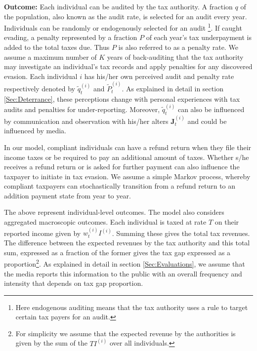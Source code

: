 \documentclass{NSF_proposal_mod}
\begin{document}

{\bf Outcome:} Each individual can be audited by the tax authority. A fraction $q$ of the population, also known as the audit rate,  is selected for an audit every year. Individuals can be randomly or endogenously selected for an audit \footnote{Here endogenous auditing means that the tax authority uses a rule to target certain tax payers for an audit.}.  If caught evading, a penalty represented by a fraction $P$ of each year's tax underpayment is added to the total taxes due. Thus $P$ is also referred to as a penalty rate. We assume a maximum number of $K$ years of back-auditing that the tax authority may investigate an individual's tax records and apply penalties for any discovered evasion. Each individual $i$ has his/her own perceived audit and penalty rate respectively denoted by $\tilde{q}^{(i)}_t$ and $\tilde{P}^{(i)}_t$. As explained in detail in section \ref{Sec:Deterrance}, these perceptions change with personal experiences with tax audits and penalties for under-reporting. Moreover, $\tilde{q}^{(i)}_t$ can also be influenced by communication and observation with his/her alters  $\mathbf{J}^{(i)}_t$ and could be influenced by media.   

In our model, compliant individuals can have a refund return when they file their income taxes or be required to pay an additional amount of taxes. Whether s/he receives a refund return or is asked for further payment can also influence the taxpayer to initiate in tax evasion. We assume a simple Markov process, whereby compliant taxpayers can stochastically transition from a refund return to an addition payment state from year to year.      
 
The above represent individual-level outcomes. The model also considers aggregated macroscopic outcomes. Each individual is taxed at rate $T$ on their reported income given by $w^{(i)}_tI^{(i)}$. Summing these gives the total tax revenues.  The difference between the expected revenues by the tax authority and this total sum, expressed as a fraction of the former gives the tax gap expressed as a proportion\footnote{For simplicity we assume that the expected revenue by the authorities is given by the sum of the $TI^{(i)}$ over all individuals.}.  As explained in detail in section \ref{Sec:Evaluations}, we assume that the media reports this information to the public with an overall frequency and intensity that depends on tax gap proportion.       
\end{document}
